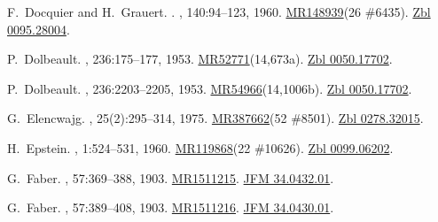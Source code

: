 \documentclass[11pt,a4paper, final, twoside]{article}
\numberwithin{equation}{section}
\begin{document}
\begin{appendices}
\begin{thebibliography}{100}
F.~Docquier and H.~Grauert.
.
, 140:94--123, 1960.
\newblock \href{http://www.ams.org/mathscinet-getitem?mr=148939}{MR148939}(26
  \#6435). \href{http://zbmath.org/?q=an:0095.28004}{Zbl 0095.28004}.

P.~Dolbeault.
, 236:175--177, 1953.
\newblock
  \href{http://www.ams.org/mathscinet-getitem?mr=52771}{MR52771}(14,673a).
  \href{http://zbmath.org/?q=an:0050.17702}{Zbl 0050.17702}.

P.~Dolbeault.
, 236:2203--2205, 1953.
\newblock
  \href{http://www.ams.org/mathscinet-getitem?mr=54966}{MR54966}(14,1006b).
  \href{http://zbmath.org/?q=an:0050.17702}{Zbl 0050.17702}.

G.~Elencwajg.
, 25(2):295--314, 1975.
\newblock \href{http://www.ams.org/mathscinet-getitem?mr=387662}{MR387662}(52
  \#8501). \href{http://zbmath.org/?q=an:0278.32015}{Zbl 0278.32015}.

H.~Epstein.
, 1:524--531, 1960.
\newblock \href{http://www.ams.org/mathscinet-getitem?mr=119868}{MR119868}(22
  \#10626). \href{http://zbmath.org/?q=an:0099.06202}{Zbl 0099.06202}.

G.~Faber.
, 57:369--388, 1903.
\newblock \href{http://www.ams.org/mathscinet-getitem?mr=1511215}{MR1511215}.
  \href{http://zbmath.org/?q=an:34.0432.01}{JFM 34.0432.01}.

G.~Faber.
, 57:389--408, 1903.
\newblock \href{http://www.ams.org/mathscinet-getitem?mr=1511216}{MR1511216}.
  \href{http://zbmath.org/?q=an:34.0430.01}{JFM 34.0430.01}.


\end{thebibliography}
\end{appendices}
\end{document}
